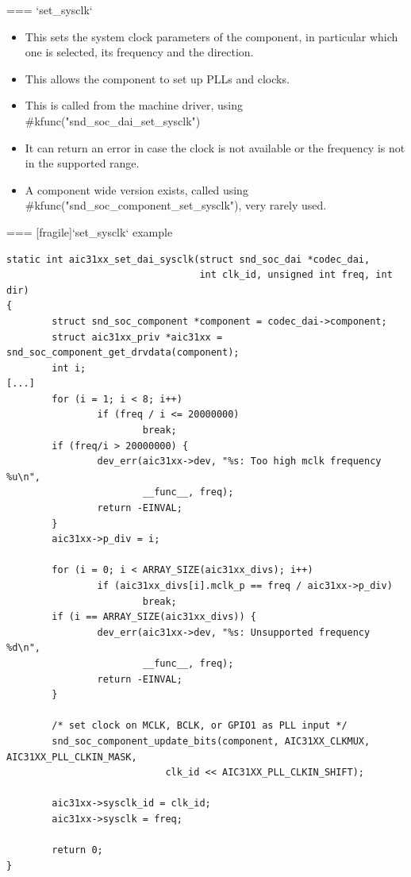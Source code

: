 === {`set_sysclk`}
  \begin{itemize}
  \item This sets the system clock parameters of the component, in
    particular which one is selected, its frequency and the direction.
  \item This allows the component to set up PLLs and clocks.
  \item This is called from the machine driver, using
    #kfunc("snd_soc_dai_set_sysclk")
  \item It can return an error in case the clock is not available or
    the frequency is not in the supported range.
  \item A component wide version exists, called using
    #kfunc("snd_soc_component_set_sysclk"), very rarely used.
  \end{itemize}



=== [fragile]{`set_sysclk` example}
  \begin{block}{}
    \fontsize{6}{6}\selectfont
    \begin{verbatim}
static int aic31xx_set_dai_sysclk(struct snd_soc_dai *codec_dai,
                                  int clk_id, unsigned int freq, int dir)
{
        struct snd_soc_component *component = codec_dai->component;
        struct aic31xx_priv *aic31xx = snd_soc_component_get_drvdata(component);
        int i;
[...]
        for (i = 1; i < 8; i++)
                if (freq / i <= 20000000)
                        break;
        if (freq/i > 20000000) {
                dev_err(aic31xx->dev, "%s: Too high mclk frequency %u\n",
                        __func__, freq);
                return -EINVAL;
        }
        aic31xx->p_div = i;

        for (i = 0; i < ARRAY_SIZE(aic31xx_divs); i++)
                if (aic31xx_divs[i].mclk_p == freq / aic31xx->p_div)
                        break;
        if (i == ARRAY_SIZE(aic31xx_divs)) {
                dev_err(aic31xx->dev, "%s: Unsupported frequency %d\n",
                        __func__, freq);
                return -EINVAL;
        }

        /* set clock on MCLK, BCLK, or GPIO1 as PLL input */
        snd_soc_component_update_bits(component, AIC31XX_CLKMUX, AIC31XX_PLL_CLKIN_MASK,
                            clk_id << AIC31XX_PLL_CLKIN_SHIFT);

        aic31xx->sysclk_id = clk_id;
        aic31xx->sysclk = freq;

        return 0;
}
    \end{verbatim}
  \end{block}


